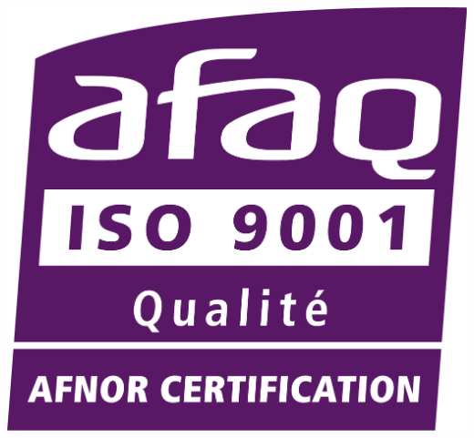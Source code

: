 \documentclass[dvipsnames,a2paper]{paper}
\begin{document}
\hspace{1cm}
\includegraphics[scale=0.1]{./images/affiche/afaq.png}
\end{document}
